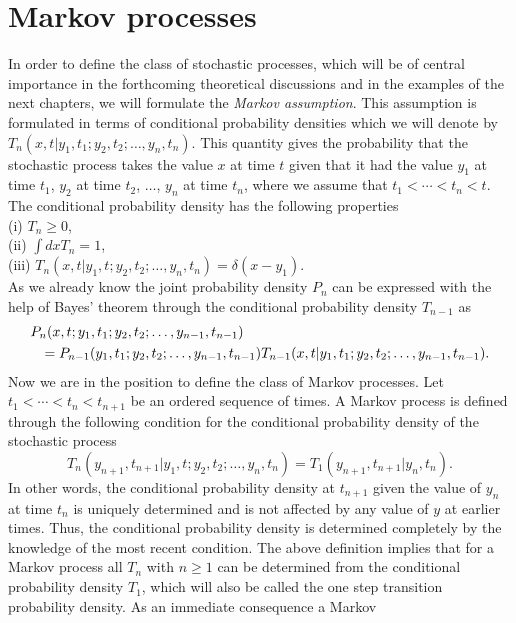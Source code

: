 \section{Markov processes}
In order to define the class of stochastic processes, which will be 
of central importance in the forthcoming theoretical discussions 
and in the examples of the next chapters, we will formulate
the {\em Markov assumption}. This assumption is formulated in 
terms of conditional probability densities which we 
will denote by
$T_n(x,t|y_1,t_1;y_2,t_2; \ldots, y_n,t_n)$. This quantity gives 
the probability that the stochastic process takes the value $x$ at 
time $t$ given that it had the value $y_1$ at time $t_1$, $y_2$
at time $t_2$, $\ldots$, $y_n$ at time $t_n$, where we assume that
$t_1< \cdots <t_n < t$.  The conditional probability density has 
the following properties \\
(i) $T_n \ge 0$, \\
(ii) $\int dx T_n = 1$,  \\
(iii) $T_n(x,t|y_1,t;y_2,t_2; \ldots, y_n,t_n) = \delta(x-y_1)$.\\
As we already know the joint probability density $P_n$ can be 
expressed with the help of Bayes' theorem through the conditional 
probability density $T_{n-1}$ as
\begin{eqnarray*}
\lefteqn{P_n(x,t;y_1,t_1;y_2,t_2; \ldots, y_{n-1},t_{n-1})} \\
&& = P_{n-1}(y_1,t_1;y_2,t_2; \ldots, y_{n-1},t_{n-1})
T_{n-1}(x,t|y_1,t_1;y_2,t_2; \ldots, y_{n-1},t_{n-1}).
\end{eqnarray*}
Now we are in the position to define the class of Markov 
processes. Let $t_1< \cdots <t_n < t_{n+1}$ be an ordered sequence 
of times. A Markov process is defined through the following 
condition for the conditional probability density of the
stochastic process
\begin{equation*}
T_{n}(y_{n+1},t_{n+1}|y_1,t;y_2,t_2; \ldots, y_{n},t_{n})
= T_{1}(y_{n+1},t_{n+1}|y_{n},t_{n}).
\end{equation*}
In other words, the conditional probability density at $t_{n+1}$
given the value of $y_n$ at time $t_n$ is uniquely determined and 
is not affected by any value of $y$ at earlier times. Thus, the
conditional probability density is determined completely by the 
knowledge of the most recent condition.
The above definition implies that for a Markov process all
$T_n$ with $n \ge 1$ can be determined from the
conditional probability density $T_1$, which will also be called
the one step 
transition probability density. As an immediate consequence a Markov 
